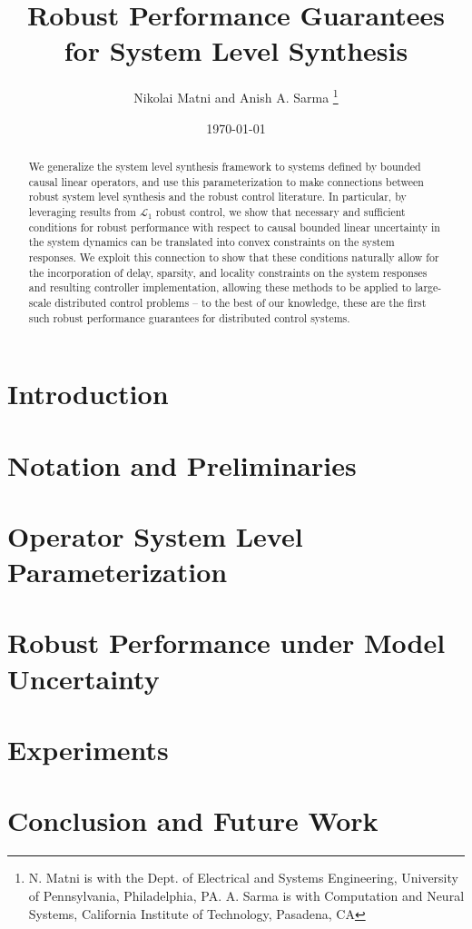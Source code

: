 \documentclass[letterpaper, 10 pt, conference]{ieeeconf}  %
\title{Robust Performance Guarantees for System Level Synthesis}
\author{Nikolai Matni and Anish A. Sarma
\thanks{N. Matni is with the Dept. of Electrical and Systems Engineering, University of Pennsylvania, Philadelphia, PA. A. Sarma is with Computation and Neural Systems, California Institute of Technology, Pasadena, CA}%
}
\date{\today}
\numberwithin{theorem}{section}
\begin{document}
\maketitle
\begin{abstract}
We generalize the system level synthesis framework to systems defined by bounded causal linear operators, and use this parameterization to make connections between robust system level synthesis and the robust control literature.  In particular, by leveraging results from $\mathcal{L}_1$ robust control, we show that necessary and sufficient conditions for robust performance with respect to causal bounded linear uncertainty in the system dynamics can be translated into convex constraints on the system responses.  We exploit this connection to show that these conditions naturally allow for the incorporation of delay, sparsity, and locality constraints on the system responses and resulting controller implementation, allowing these methods to be applied to large-scale distributed control problems -- to the best of our knowledge, these are the first such robust performance guarantees for distributed control systems.  %
\end{abstract}

\section{Introduction}
\label{sec:introduction}


\section{Notation and Preliminaries}
\label{sec:notation}


\section{Operator System Level Parameterization}
\label{sec:operator}


\section{Robust Performance under Model Uncertainty}
\label{sec:robust-perf}




\section{Experiments}
\label{sec:experiments}


\section{Conclusion and Future Work}
\label{sec:conclusion}




 
\end{document}
